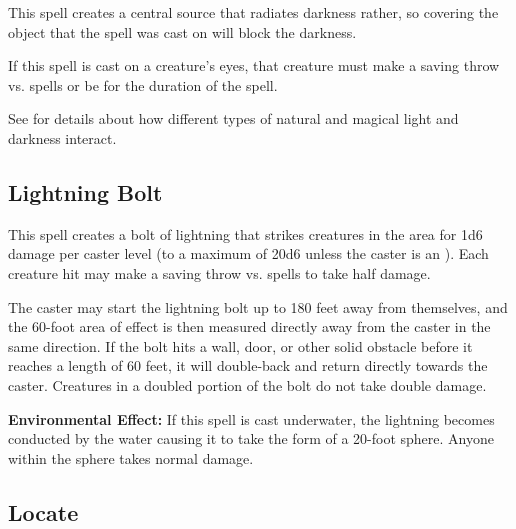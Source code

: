 \begin{multicols*}{2}
This spell creates a central source that radiates darkness rather, so covering the object that the spell was cast on will block the darkness.

If this spell is cast on a creature’s eyes, that creature must make a saving throw vs. spells or be  for the duration of the spell.

See  for details about how different types of natural and magical light and darkness interact.

\subsection{Lightning Bolt}\label{spell:Lightning Bolt}

This spell creates a bolt of lightning that strikes creatures in the area for 1d6 damage per caster level (to a maximum of 20d6 unless the caster is an ). Each creature hit may make a saving throw vs. spells to take half damage.

The caster may start the lightning bolt up to 180 feet away from themselves, and the 60-foot area of effect is then measured directly away from the caster in the same direction. If the bolt hits a wall, door, or other solid obstacle before it reaches a length of 60 feet, it will double-back and return directly towards the caster. Creatures in a doubled portion of the bolt do not take double damage.

\textbf{Environmental Effect:} If this spell is cast underwater, the lightning becomes conducted by the water causing it to take the form of a 20-foot sphere. Anyone within the sphere takes normal damage.

\subsection{Locate}\label{spell:Locate}


\end{multicols*}
